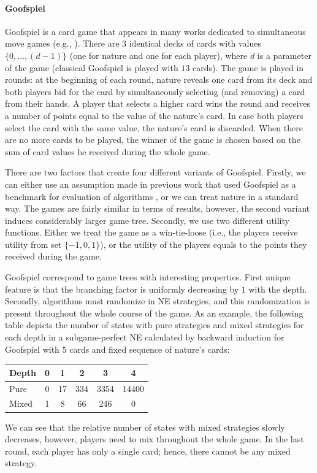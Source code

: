 \paragraph{\textbf{Goofspiel}}
Goofspiel is a card game that appears in many works dedicated to simultaneous move games (e.g., \cite{Ross71Goofspiel,Rhoads12Computer,Saffidine12SMAB,Lanctot13Goofspiel}). 
There are $3$ identical decks of cards with values $\{0,\dots, (d-1)\}$ (one for nature and one for each player), where $d$ is a parameter of the game (classical Goofspiel is played with $13$ cards). 
The game is played in rounds: at the beginning of each round, nature reveals one card from its deck and both players bid for the card by simultaneously selecting (and removing) a card from their hands. 
A player that selects a higher card wins the round and receives a number of points equal to the value of the nature's card. 
In case both players select the card with the same value, the nature's card is discarded. 
When there are no more cards to be played, the winner of the game is chosen based on the sum of card values he received during the whole game. 

There are two factors that create four different variants of Goofspiel.
Firstly, we can either use an assumption made in previous work that used Goofspiel as a benchmark for evaluation of algorithms \cite{Saffidine12SMAB}, or we can treat nature in a standard way. 
The games are fairly similar in terms of results, however, the second variant induces considerably larger game tree.
Secondly, we use two different utility functions. 
Either we treat the game as a win-tie-loose (i.e., the players receive utility from set $\lbrace -1, 0, 1 \rbrace$), or the utility of the players equals to the points they received during the game.

Goofspiel correspond to game trees with interesting properties. 
First unique feature is that the branching factor is uniformly decreasing by $1$ with the depth.
Secondly, algorithms must randomize in NE strategies, and this randomization is present throughout the whole course of the game.
As an example, the following table depicts the number of states with pure strategies and mixed strategies for each depth in a subgame-perfect NE calculated by backward induction for Goofspiel with $5$ cards and fixed sequence of nature's cards:

\begin{table}[h!]
\centering
\small
\begin{tabular}{|l|c|c|c|c|c|}
\hline Depth & 0 & 1 & 2 & 3 & 4 \\
\hline Pure  & 0 & 17 & 334 & 3354 & 14400 \\
\hline Mixed & 1 &  8 &  66 &  246 & 0 \\
\hline
\end{tabular}
\end{table}
We can see that the relative number of states with mixed strategies slowly decreases, however, players need to mix throughout the whole game.
In the last round, each player has only a single card; hence, there cannot be any mixed strategy.


